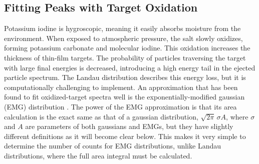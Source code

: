 \subsection{Fitting Peaks with Target Oxidation} \label{subsec:oxidation}

Potassium iodine is hygroscopic, meaning it easily absorbs moisture from the environment. When exposed to atmospheric pressure, the salt slowly oxidizes, forming potassium carbonate and molecular iodine. This oxidation increases the thickness of thin-film targets. The probability of particles traversing the target with large final energies is decreased, introducing a high energy tail in the ejected particle spectrum. The Landau distribution describes this energy loss, but it is computationally challenging to implement. An approximation that has been found to fit oxidized-target spectra well is the exponentially-modified gaussian (EMG) distribution \cite{Babu2016}. The power of the EMG approximation is that its area calculation is the exact same as that of a gaussian distribution, $\sqrt{2\pi} \, \sigma A$, where $\sigma$ and $A$ are parameters of both gaussians and EMGs, but they have slightly different definitions as it will become clear below. This makes it very simple to determine the number of counts for EMG distributions, unlike Landau distributions, where the full area integral must be calculated.


